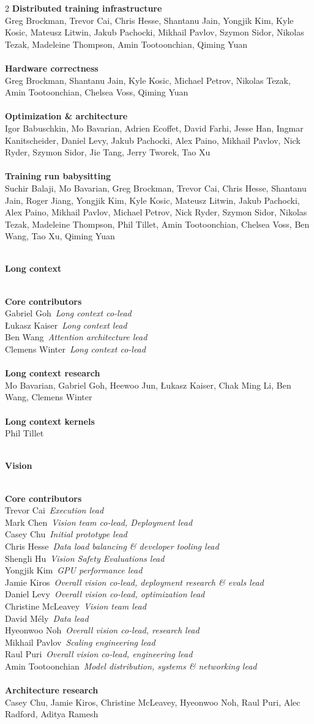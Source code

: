 \documentclass{article}
\newcommand{\creditsectionheader}[1]{\parbox{\columnwidth}{\centering \textbf{\small #1}}\\}
\newcommand{\creditlistheader}[1]{\textbf{#1}\footnotemark[\thefootnote]\\}
\newcommand{\creditlist}[2]{\creditlistheader{#1}#2\\
\\}
\newcommand{\corecontributor}[2]{#1\ \textit{#2}\\}
\begin{document}
\begin{multicols}{2}
\creditlist{Distributed training infrastructure}{Greg Brockman, Trevor Cai, Chris Hesse, Shantanu Jain, Yongjik Kim, Kyle Kosic, Mateusz Litwin, Jakub Pachocki, Mikhail Pavlov, Szymon Sidor, Nikolas Tezak, Madeleine Thompson, Amin Tootoonchian, Qiming Yuan}
\creditlist{Hardware correctness}{Greg Brockman, Shantanu Jain, Kyle Kosic, Michael Petrov, Nikolas Tezak, Amin Tootoonchian, Chelsea Voss, Qiming Yuan}
\creditlist{Optimization \& architecture}{
Igor Babuschkin, Mo Bavarian, Adrien Ecoffet, David Farhi, Jesse Han, Ingmar Kanitscheider, Daniel Levy, Jakub Pachocki, Alex Paino, Mikhail Pavlov, Nick Ryder, Szymon Sidor, Jie Tang, Jerry Tworek, Tao Xu}
\creditlist{Training run babysitting}{
Suchir Balaji, Mo Bavarian, Greg Brockman, Trevor Cai, Chris Hesse, Shantanu Jain, Roger Jiang, Yongjik Kim, Kyle Kosic, Mateusz Litwin, Jakub Pachocki, Alex Paino, Mikhail Pavlov, Michael Petrov, Nick Ryder, Szymon Sidor, Nikolas Tezak, Madeleine Thompson, Phil Tillet, Amin Tootoonchian, Chelsea Voss, Ben Wang, Tao Xu, Qiming Yuan}
\creditsectionheader{Long context}
\creditlistheader{Core contributors}
\corecontributor{Gabriel Goh}{Long context co-lead}
\corecontributor{\L{}ukasz Kaiser}{Long context lead}
\corecontributor{Ben Wang}{Attention architecture lead}
\corecontributor{Clemens Winter}{Long context co-lead}
\\
\creditlist{Long context research}{Mo Bavarian, Gabriel Goh, Heewoo Jun, \L{}ukasz Kaiser, Chak Ming Li, Ben Wang, Clemens Winter}
\creditlist{Long context kernels}{Phil Tillet}
\creditsectionheader{Vision}
\creditlistheader{Core contributors}
\corecontributor{Trevor Cai}{Execution lead}
\corecontributor{Mark Chen}{Vision team co-lead, Deployment lead}
\corecontributor{Casey Chu}{Initial prototype lead}
\corecontributor{Chris Hesse}{Data load balancing \& developer tooling lead}
\corecontributor{Shengli Hu}{Vision Safety Evaluations lead}
\corecontributor{Yongjik Kim}{GPU performance lead}
\corecontributor{Jamie Kiros}{Overall vision co-lead, deployment research \& evals lead}
\corecontributor{Daniel Levy}{Overall vision co-lead, optimization lead}
\corecontributor{Christine McLeavey}{Vision team lead}
\corecontributor{David M\'ely}{Data lead}
\corecontributor{Hyeonwoo Noh}{Overall vision co-lead, research lead}
\corecontributor{Mikhail Pavlov}{Scaling engineering lead}
\corecontributor{Raul Puri}{Overall vision co-lead, engineering lead}
\corecontributor{Amin Tootoonchian}{Model distribution, systems \& networking lead}
\\
\creditlist{Architecture research}{Casey Chu, Jamie Kiros, Christine McLeavey, Hyeonwoo Noh, Raul Puri, Alec Radford, Aditya Ramesh}

\end{multicols}
\end{document}
